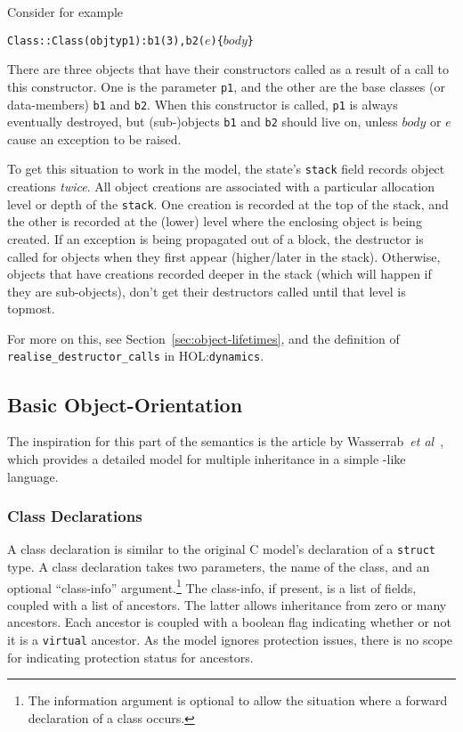 \documentclass[11pt]{article}
\newcommand{\HOLfile}[1]{HOL:\texttt{#1}}
\begin{document}
Consider for example
\begin{alltt}
  Class::Class(objty p1) : b1(3), b2(\(e\)) \{ \(\mathit{body}\) \}
\end{alltt}
There are three objects that have their constructors called as a
result of a call to this constructor.  One is the parameter
\texttt{p1}, and the other are the base classes (or data-members)
\texttt{b1} and \texttt{b2}.  When this constructor is called,
\texttt{p1} is always eventually destroyed, but (sub-)objects
\texttt{b1} and \texttt{b2} should live on, unless $\mathit{body}$ or
$e$ cause an exception to be raised.

To get this situation to work in the model, the state's \texttt{stack}
field records object creations \emph{twice}.  All object creations are
associated with a particular allocation level or depth of the
\texttt{stack}.  One creation is recorded at the top of the stack, and
the other is recorded at the (lower) level where the enclosing object
is being created.  If an exception is being propagated out of a block,
the destructor is called for objects when they first appear
(higher/later in the stack).  Otherwise, objects that have creations
recorded deeper in the stack (which will happen if they are
sub-objects), don't get their destructors called until that level is
topmost.

For more on this, see Section~\ref{sec:object-lifetimes}, and the
definition of \texttt{realise_destructor_calls} in
\HOLfile{dynamics}.

\subsection{Basic Object-Orientation}
\label{sec:basic-oo}

The inspiration for this part of the semantics is the article by
Wasserrab~\emph{et al}~\cite{wasserrab-nst-OOPSLA06}, which provides a
detailed model for multiple inheritance in a simple \cpp-like
language.

\subsubsection{Class Declarations}
\label{sec:class-declaration}
A class declaration is similar to the original C model's declaration
of a \texttt{struct} type.  A class declaration takes two parameters,
the name of the class, and an optional ``class-info''
argument.\footnote{The information argument is optional to allow the
  situation where a forward declaration of a class occurs.}  The
class-info, if present, is a list of fields, coupled with a list of
ancestors.  The latter allows inheritance from zero or many ancestors.
Each ancestor is coupled with a boolean flag indicating whether or not
it is a \texttt{virtual} ancestor.  As the model ignores protection
issues, there is no scope for indicating protection status for
ancestors.
\end{document}
